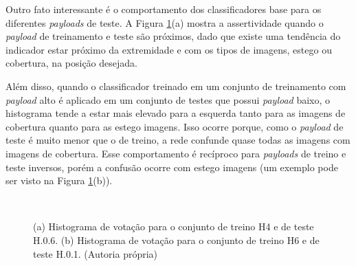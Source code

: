 Outro fato interessante é o comportamento dos classificadores base para os diferentes \textit{payloads} de teste. A Figura \ref{fig:votes}(a) mostra a assertividade quando o \textit{payload} de treinamento e teste são próximos, dado que existe uma tendência do indicador estar próximo da extremidade e com os tipos de imagens, estego ou cobertura, na posição desejada.

Além disso, quando o classificador treinado em um conjunto de treinamento com  \textit{payload} alto é aplicado em um conjunto de testes que possui \textit{payload} baixo, o histograma tende a estar mais elevado para a esquerda tanto para as imagens de cobertura quanto para as estego imagens. Isso ocorre porque, como o \textit{payload} de teste é muito menor que o de treino, a rede confunde quase todas as imagens com imagens de cobertura. Esse comportamento é recíproco para \textit{payloads} de treino e teste inversos, porém a confusão ocorre com estego imagens (um exemplo pode ser visto na Figura \ref{fig:votes}(b)).

\begin{figure}[!htb]
\centering
	\qquad
	\\ 

\caption{(a) Histograma de votação para o conjunto de treino H4 e de teste H.0.6. (b) Histograma de votação para o conjunto de treino H6 e de teste H.0.1. (Autoria própria)}
\label{fig:votes}
\end{figure}





